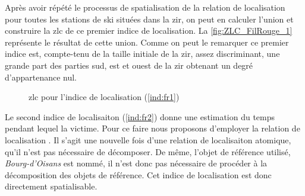 Après avoir répété le processus de spatialisation de la relation de
localisation  pour
toutes les stations de ski situées dans la \ac{zir}, on peut en
calculer l'union et construire la \ac{zlc} de ce premier indice de
localisation. La \autoref{fig:ZLC_FilRouge_1} représente le résultat
de cette union.
%
Comme on peut le remarquer ce premier indice est, compte-tenu de la
taille initiale de la \ac{zir}, assez discriminant, une grande part
des parties sud, est et ouest de la \ac{zir} obtenant un degré
d'appartenance nul.

\begin{figure}[hbt]
  \centering
  
  \caption{\ac{zlc} pour l'indice de localisation  (\ref{ind:fr1})}
  \label{fig:ZLC_FilRouge_1}
\end{figure}



Le second indice de localisaiton (\ref{ind:fr2}) donne une estimation
du temps pendant lequel la victime. Pour ce faire nous proposons
d’employer la relation de localisation
. Il s'agit une nouvelle fois
d'une relation de localisaiton atomique, qu'il n'est pas nécessaire de
décomposer. De même, l'objet de référence utilisé,
\emph{Bourg-d'Oisans} est nommé, il n'est donc pas nécessaire de
procéder à la décomposition des objets de référence. Cet indice de
localisation est donc directement spatialisable.

